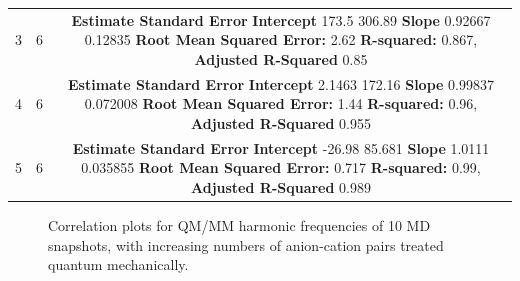 \begin{table}
\begin{longtable}[]{@{}ccc@{}}
    \begin{minipage}[t]{0.32\columnwidth}\raggedright
      3\strut
    \end{minipage} & \begin{minipage}[t]{0.32\columnwidth}\raggedright
      6\strut
    \end{minipage} & \begin{minipage}[t]{0.32\columnwidth}\raggedright
      \textbf{Estimate Standard Error}
      \textbf{Intercept} 173.5 306.89
      \textbf{Slope} 0.92667 0.12835
      \textbf{Root Mean Squared Error:} 2.62
      \textbf{R-squared:} 0.867, \textbf{Adjusted R-Squared} 0.85\strut
    \end{minipage}\tabularnewline
    \begin{minipage}[t]{0.32\columnwidth}\raggedright
      4\strut
    \end{minipage} & \begin{minipage}[t]{0.32\columnwidth}\raggedright
      6\strut
    \end{minipage} & \begin{minipage}[t]{0.32\columnwidth}\raggedright
      \textbf{Estimate Standard Error}
      \textbf{Intercept} 2.1463 172.16
      \textbf{Slope} 0.99837 0.072008
      \textbf{Root Mean Squared Error:} 1.44
      \textbf{R-squared:} 0.96, \textbf{Adjusted R-Squared} 0.955\strut
    \end{minipage}\tabularnewline
    \begin{minipage}[t]{0.32\columnwidth}\raggedright
      5\strut
    \end{minipage} & \begin{minipage}[t]{0.32\columnwidth}\raggedright
      6\strut
    \end{minipage} & \begin{minipage}[t]{0.32\columnwidth}\raggedright
      \textbf{Estimate Standard Error}
      \textbf{Intercept} -26.98 85.681
      \textbf{Slope} 1.0111 0.035855
      \textbf{Root Mean Squared Error:} 0.717
      \textbf{R-squared:} 0.99, \textbf{Adjusted R-Squared} 0.989\strut
    \end{minipage}\tabularnewline
    \bottomrule
  \end{longtable}
\end{table}

\begin{figure}
  \centering
  \caption{Correlation plots for QM/MM harmonic frequencies of \num{10} MD snapshots, with increasing numbers of anion-cation pairs treated quantum mechanically.}
  \label{paper_02:fig:S5}
\end{figure}
